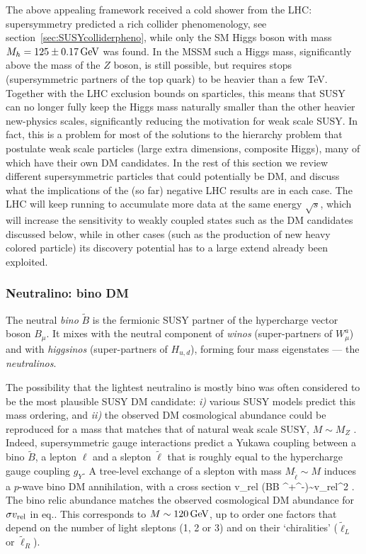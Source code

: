 \medskip


The above appealing framework received a cold shower from the LHC: 
supersymmetry predicted a rich collider phenomenology, see section~\ref{sec:SUSYcolliderpheno}, 
while only the SM Higgs boson with mass $M_h = 125 \pm 0.17 \,{\rm GeV}$ 
was found.  
In the MSSM such a Higgs mass, significantly above the mass of the $Z$ boson, is still possible, 
but requires stops (supersymmetric partners of the top quark) to be  heavier than a few TeV.
Together with the LHC exclusion bounds on sparticles, this means that SUSY can no longer 
fully keep the Higgs mass  naturally smaller
than the other heavier new-physics scales, significantly reducing the motivation for weak scale SUSY. 
In fact, this is a problem for most of the solutions to the hierarchy problem that postulate weak scale particles (large extra dimensions, composite Higgs), 
many of which have their own DM candidates. 
In the rest of this section we review different supersymmetric particles that could potentially be DM, 
and discuss what the implications of the (so far) negative LHC results are in each case. 
The LHC will keep running to accumulate more data at the same energy $\sqrt{s}$, which will increase the sensitivity to weakly coupled states such as the DM candidates discussed below, while in other cases (such as the production of new heavy colored particle) its discovery potential has to a large extend already been exploited.





\subsubsection{Neutralino: bino DM}
\label{sec:Bino}
The neutral {\em bino} $\tilde B$ is the fermionic SUSY partner of the hypercharge vector boson $B_\mu$.
It mixes with the neutral component of {\em winos} (super-partners of $W_\mu^a$) and with {\em higgsinos} 
(super-partners of $H_{u,d}$), forming four mass eigenstates --- the {\em neutralinos}. 

The possibility that the lightest neutralino is mostly bino 
was often considered to be the most plausible SUSY DM candidate: 
{\em i)} various SUSY models predict this mass ordering, and {\em ii)} 
the observed DM cosmological abundance could be reproduced for a mass that matches that of natural weak scale SUSY, $M\sim M_Z$ \cite{SuSyDM}. 
Indeed, supersymmetric gauge interactions predict a Yukawa coupling between
a bino $\tilde B$, a lepton $\ell$ and a slepton $\tilde\ell$ that is
roughly equal to the hypercharge gauge coupling $g_Y$.
A tree-level exchange of a slepton with mass $M_{\tilde \ell} \sim M$ induces a $p$-wave bino DM annihilation, with a cross section
\beq \label{eq:sigmavBino}
\sigma v_{\rm rel} (\tilde B\tilde B \to \ell^+\ell^-)\sim  v_{\rm rel}^2 .
\eeq
The bino relic abundance matches the observed cosmological DM abundance for 
$ \sigma v_{\rm rel}$ in eq.. This corresponds to
$M \sim 120\,{\rm GeV}$, up to order one factors that depend on the number of light sleptons 
(1, 2 or 3) and on their `chiralities' ($\tilde\ell_L$ or $\tilde\ell_R$).  

